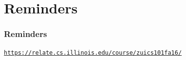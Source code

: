\documentclass[11pt]{beamer}
\begin{document}
\section{Reminders}

\begin{frame}
  \frametitle{Reminders}
  \Enlarge

  \begin{center}
    \textcolor{\CSBase}{\small \texttt{\url{https://relate.cs.illinois.edu/course/zuics101fa16/}}}
  \end{center}
\end{frame}
\end{document}
